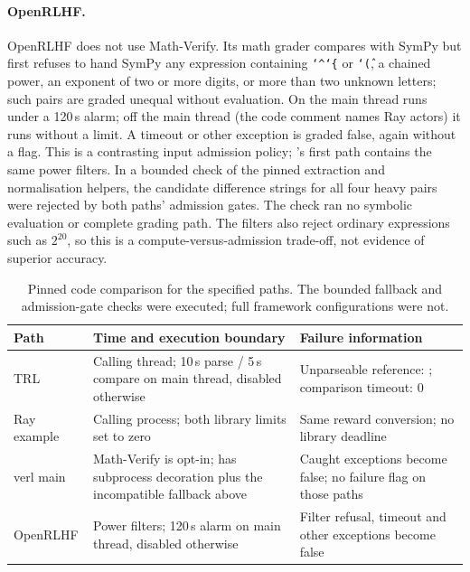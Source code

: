 \documentclass[11pt,a4paper]{article}
\begin{document}
\paragraph{OpenRLHF.} OpenRLHF \cite{openrlhf} does not use Math-Verify. Its math grader compares with SymPy  but first refuses to hand SymPy any expression containing \texttt{\char`\^\char`\{} or \texttt{\char`\^(}, a chained power, an exponent of two or more digits, or more than two unknown letters; such pairs are graded unequal without evaluation. On the main thread  runs under a 120\,s alarm; off the main thread (the code comment names Ray actors) it runs without a limit. A timeout or other exception is graded false, again without a flag. This is a contrasting input admission policy; 's first path contains the same power filters. In a bounded check of the pinned extraction and normalisation helpers, the candidate difference strings for all four heavy pairs were rejected by both paths' admission gates. The check ran no symbolic evaluation or complete grading path. The filters also reject ordinary expressions such as $2^{20}$, so this is a compute-versus-admission trade-off, not evidence of superior accuracy.

\begin{table}[h]\centering\small
\caption{Pinned code comparison for the specified paths. The bounded fallback and admission-gate checks were executed; full framework configurations were not.}\label{tab:frameworks}
\begin{tabularx}{\textwidth}{@{}l L L@{}}\toprule
Path & Time and execution boundary & Failure information\\\midrule
TRL & Calling thread; 10\,s parse / 5\,s compare on main thread, disabled otherwise & Unparseable reference: ; comparison timeout: 0\\
Ray example & Calling process; both library limits set to zero & Same reward conversion; no library deadline\\
verl main & Math-Verify is opt-in;  has subprocess decoration plus the incompatible fallback above & Caught exceptions become false; no failure flag on those paths\\
OpenRLHF & Power filters; 120\,s alarm on main thread, disabled otherwise & Filter refusal, timeout and other exceptions become false\\\bottomrule
\end{tabularx}
\end{table}
\end{document}
